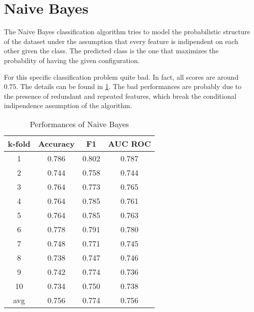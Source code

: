 \section{Naive Bayes}
\label{sec:naive_bayes}

The Naive Bayes classification algorithm tries to model the probabilistic structure of the dataset under the assumption that every feature is indipendent on each other given the class.
The predicted class is the one that maximizes the probability of having the given configuration.

For this specific classification problem quite bad.
In fact, all scores are around $0.75$.
The details can be found in \cref{tab:naive_bayes}.
The bad performances are probably due to the presence of redundant and repeated features, which break the conditional indipendence assumption of the algorithm.

\begin{table}
	\centering
	\caption{Performances of Naive Bayes}
	\label{tab:naive_bayes}
	\begin{tabular}{cccc}
		\toprule
			\multicolumn{1}{c}{k-fold} &
			\multicolumn{1}{c}{Accuracy} &
			\multicolumn{1}{c}{F1} &
			\multicolumn{1}{c}{AUC ROC} \\
		\midrule
			  1  & 0.786 & 0.802 & 0.787 \\
			  2  & 0.744 & 0.758 & 0.744 \\
			  3  & 0.764 & 0.773 & 0.765 \\
			  4  & 0.764 & 0.785 & 0.761 \\
			  5  & 0.764 & 0.785 & 0.763 \\
			  6  & 0.778 & 0.791 & 0.780 \\
			  7  & 0.748 & 0.771 & 0.745 \\
			  8  & 0.738 & 0.747 & 0.746 \\
			  9  & 0.742 & 0.774 & 0.736 \\
			 10  & 0.734 & 0.750 & 0.738 \\[2pt]
			\hline
			 avg & 0.756 & 0.774 & 0.756 \Tstrut\Bstrut\\
		\bottomrule
	\end{tabular}
\end{table}
